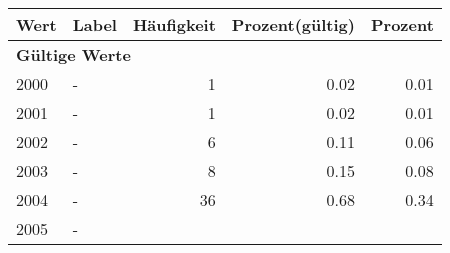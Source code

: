      \begin{longtable}{lXrrr}
     \toprule
     \textbf{Wert} & \textbf{Label} & \textbf{Häufigkeit} & \textbf{Prozent(gültig)} & \textbf{Prozent} \\
     \endhead
     \midrule
     \multicolumn{5}{l}{\textbf{Gültige Werte}}\\

     2000 &
     \multicolumn{1}{X}{ -  } &


       \num{1} &
       \num[round-mode=places,round-precision=2]{0.02} &
         \num[round-mode=places,round-precision=2]{0.01} \\

     2001 &
     \multicolumn{1}{X}{ -  } &


       \num{1} &
       \num[round-mode=places,round-precision=2]{0.02} &
         \num[round-mode=places,round-precision=2]{0.01} \\

     2002 &
     \multicolumn{1}{X}{ -  } &


       \num{6} &
       \num[round-mode=places,round-precision=2]{0.11} &
         \num[round-mode=places,round-precision=2]{0.06} \\

     2003 &
     \multicolumn{1}{X}{ -  } &


       \num{8} &
       \num[round-mode=places,round-precision=2]{0.15} &
         \num[round-mode=places,round-precision=2]{0.08} \\

     2004 &
     \multicolumn{1}{X}{ -  } &


       \num{36} &
       \num[round-mode=places,round-precision=2]{0.68} &
         \num[round-mode=places,round-precision=2]{0.34} \\

     2005 &
     \multicolumn{1}{X}{ -  } &



\end{longtable}
